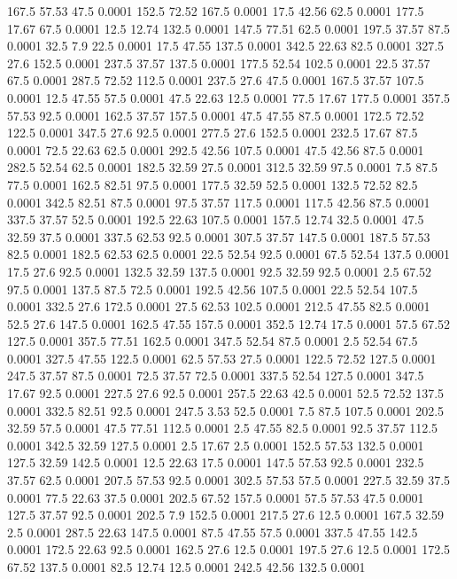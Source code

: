 167.5	57.53	47.5	0.0001
152.5	72.52	167.5	0.0001
17.5	42.56	62.5	0.0001
177.5	17.67	67.5	0.0001
12.5	12.74	132.5	0.0001
147.5	77.51	62.5	0.0001
197.5	37.57	87.5	0.0001
32.5	7.9	22.5	0.0001
17.5	47.55	137.5	0.0001
342.5	22.63	82.5	0.0001
327.5	27.6	152.5	0.0001
237.5	37.57	137.5	0.0001
177.5	52.54	102.5	0.0001
22.5	37.57	67.5	0.0001
287.5	72.52	112.5	0.0001
237.5	27.6	47.5	0.0001
167.5	37.57	107.5	0.0001
12.5	47.55	57.5	0.0001
47.5	22.63	12.5	0.0001
77.5	17.67	177.5	0.0001
357.5	57.53	92.5	0.0001
162.5	37.57	157.5	0.0001
47.5	47.55	87.5	0.0001
172.5	72.52	122.5	0.0001
347.5	27.6	92.5	0.0001
277.5	27.6	152.5	0.0001
232.5	17.67	87.5	0.0001
72.5	22.63	62.5	0.0001
292.5	42.56	107.5	0.0001
47.5	42.56	87.5	0.0001
282.5	52.54	62.5	0.0001
182.5	32.59	27.5	0.0001
312.5	32.59	97.5	0.0001
7.5	87.5	77.5	0.0001
162.5	82.51	97.5	0.0001
177.5	32.59	52.5	0.0001
132.5	72.52	82.5	0.0001
342.5	82.51	87.5	0.0001
97.5	37.57	117.5	0.0001
117.5	42.56	87.5	0.0001
337.5	37.57	52.5	0.0001
192.5	22.63	107.5	0.0001
157.5	12.74	32.5	0.0001
47.5	32.59	37.5	0.0001
337.5	62.53	92.5	0.0001
307.5	37.57	147.5	0.0001
187.5	57.53	82.5	0.0001
182.5	62.53	62.5	0.0001
22.5	52.54	92.5	0.0001
67.5	52.54	137.5	0.0001
17.5	27.6	92.5	0.0001
132.5	32.59	137.5	0.0001
92.5	32.59	92.5	0.0001
2.5	67.52	97.5	0.0001
137.5	87.5	72.5	0.0001
192.5	42.56	107.5	0.0001
22.5	52.54	107.5	0.0001
332.5	27.6	172.5	0.0001
27.5	62.53	102.5	0.0001
212.5	47.55	82.5	0.0001
52.5	27.6	147.5	0.0001
162.5	47.55	157.5	0.0001
352.5	12.74	17.5	0.0001
57.5	67.52	127.5	0.0001
357.5	77.51	162.5	0.0001
347.5	52.54	87.5	0.0001
2.5	52.54	67.5	0.0001
327.5	47.55	122.5	0.0001
62.5	57.53	27.5	0.0001
122.5	72.52	127.5	0.0001
247.5	37.57	87.5	0.0001
72.5	37.57	72.5	0.0001
337.5	52.54	127.5	0.0001
347.5	17.67	92.5	0.0001
227.5	27.6	92.5	0.0001
257.5	22.63	42.5	0.0001
52.5	72.52	137.5	0.0001
332.5	82.51	92.5	0.0001
247.5	3.53	52.5	0.0001
7.5	87.5	107.5	0.0001
202.5	32.59	57.5	0.0001
47.5	77.51	112.5	0.0001
2.5	47.55	82.5	0.0001
92.5	37.57	112.5	0.0001
342.5	32.59	127.5	0.0001
2.5	17.67	2.5	0.0001
152.5	57.53	132.5	0.0001
127.5	32.59	142.5	0.0001
12.5	22.63	17.5	0.0001
147.5	57.53	92.5	0.0001
232.5	37.57	62.5	0.0001
207.5	57.53	92.5	0.0001
302.5	57.53	57.5	0.0001
227.5	32.59	37.5	0.0001
77.5	22.63	37.5	0.0001
202.5	67.52	157.5	0.0001
57.5	57.53	47.5	0.0001
127.5	37.57	92.5	0.0001
202.5	7.9	152.5	0.0001
217.5	27.6	12.5	0.0001
167.5	32.59	2.5	0.0001
287.5	22.63	147.5	0.0001
87.5	47.55	57.5	0.0001
337.5	47.55	142.5	0.0001
172.5	22.63	92.5	0.0001
162.5	27.6	12.5	0.0001
197.5	27.6	12.5	0.0001
172.5	67.52	137.5	0.0001
82.5	12.74	12.5	0.0001
242.5	42.56	132.5	0.0001
